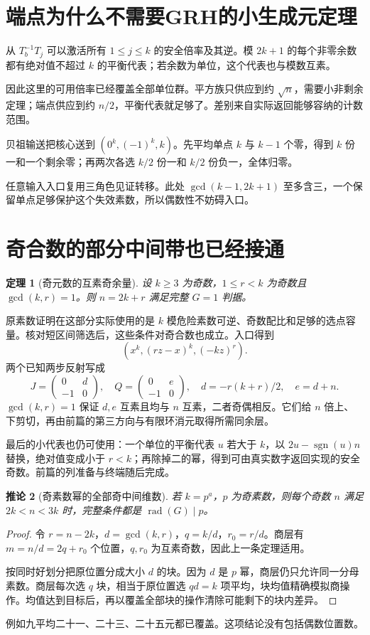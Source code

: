 \documentclass[11pt,a4paper,oneside,openany]{book}
\newcommand{\rad}{\operatorname{rad}}\newcommand{\diag}{\operatorname{diag}}
\newtheorem{theorem}{定理}[chapter]
\newtheorem{corollary}[theorem]{推论}
\theoremstyle{definition}\newtheorem{example}[theorem]{例}\newtheorem{conjecture}[theorem]{猜想}
\numberwithin{equation}{chapter}\setcounter{tocdepth}{1}
\begin{document}
\section{端点为什么不需要GRH的小生成元定理}
从 $T_b^{-1}T_j$ 可以激活所有 $1\le j\le k$ 的安全倍率及其逆。模 $2k+1$ 的每个非零余数都有绝对值不超过 $k$ 的平衡代表；若余数为单位，这个代表也与模数互素。

因此这里的可用倍率已经覆盖全部单位群。平方族只供应到约 $\sqrt n$，需要小非剩余定理；端点供应到约 $n/2$，平衡代表就足够了。差别来自实际返回能够容纳的计数范围。

贝祖输送把核心送到 $(0^k,(-1)^k,k)$。先平均单点 $k$ 与 $k-1$ 个零，得到 $k$ 份一和一个剩余零；再两次各选 $k/2$ 份一和 $k/2$ 份负一，全体归零。

任意输入入口复用三角色见证转移。此处 $\gcd(k-1,2k+1)$ 至多含三，一个保留单点足够保护这个失效素数，所以偶数性不妨碍入口。

\section{奇合数的部分中间带也已经接通}
\begin{theorem}[奇元数的互素奇余量]
设 $k\ge3$ 为奇数，$1\le r<k$ 为奇数且 $\gcd(k,r)=1$。则 $n=2k+r$ 满足完整 $G=1$ 判据。
\end{theorem}
原素数证明在这部分实际使用的是 $k$ 模危险素数可逆、奇数配比和足够的选点容量。核对短区间筛选后，这些条件对奇合数也成立。入口得到
\[(x^k,(rz-x)^k,(-kz)^r).
\]
两个已知两步反射写成
\[J=\begin{pmatrix}0&d\\-1&0\end{pmatrix},\quad
Q=\begin{pmatrix}0&e\\-1&0\end{pmatrix},\quad
d=-r(k+r)/2,\quad e=d+n.
\]
$\gcd(k,r)=1$ 保证 $d,e$ 互素且均与 $n$ 互素，二者奇偶相反。它们给 $n$ 倍上、下剪切，再由前篇的第三方向与有限环消元取得所需同余层。

最后的小代表也仍可使用：一个单位的平衡代表 $u$ 若大于 $k$，以 $2u-\operatorname{sgn}(u)n$ 替换，绝对值变成小于 $r<k$；再除掉二的幂，得到可由真实数字返回实现的安全奇数。前篇的列准备与终端随后完成。

\begin{corollary}[奇素数幂的全部奇中间维数]
若 $k=p^a$，$p$ 为奇素数，则每个奇数 $n$ 满足 $2k<n<3k$ 时，完整条件都是 $\rad(G)\mid p$。
\end{corollary}
\begin{proof}
令 $r=n-2k$，$d=\gcd(k,r)$，$q=k/d$，$r_0=r/d$。商层有 $m=n/d=2q+r_0$ 个位置，$q,r_0$ 为互素奇数，因此上一条定理适用。

按同时好划分把原位置分成大小 $d$ 的块。因为 $d$ 是 $p$ 幂，商层仍只允许同一分母素数。商层每次选 $q$ 块，相当于原位置选 $qd=k$ 项平均，块均值精确模拟商操作。均值达到目标后，再以覆盖全部块的操作清除可能剩下的块内差异。
\end{proof}
例如九平均二十一、二十三、二十五元都已覆盖。这项结论没有包括偶数位置数。
\end{document}
